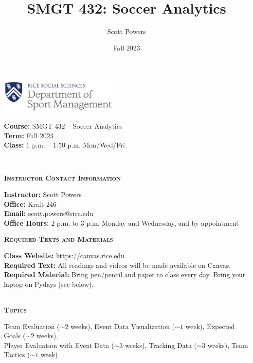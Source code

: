 \documentclass[11pt]{article}
\title{SMGT 432: Soccer Analytics}
\author{Scott Powers}
\date{Fall 2023}
\begin{document}
\begin{multicols}{2}

	\includegraphics[width = 0.45\textwidth]{../../images/rice_smgt.png}

	\columnbreak

	\raggedleft
	{\bf Course:} SMGT $432$ -- Soccer Analytics\\
	{\bf Term:} Fall $2023$\\
	{\bf Class:} $1$ p.m. -- $1$:$50$ p.m. Mon/Wed/Fri

\end{multicols}

\hrule

~\\
\textbf{\textsc{Instructor Contact Information}}
\begin{adjustwidth}{1cm}{0cm}
	{\bf Instructor:} Scott Powers\\
  {\bf Office:} Kraft $246$\\
  {\bf Email:} scott.powers@rice.edu\\
  {\bf Office Hours:} $2$ p.m. to $3$ p.m. Monday and Wednesday, and by appointment\\
\end{adjustwidth}

\textbf{\textsc{Required Texts and Materials}}
\begin{adjustwidth}{1cm}{0cm}
	{\bf Class Website:} https://canvas.rice.edu\\
	{\bf Required Text:} All readings and videos will be made available on Canvas.\\
	{\bf Required Material:} Bring pen/pencil and paper to class every day. Bring your laptop on Pydays (see below).
\end{adjustwidth}

~\\
\textbf{\textsc{Topics}}
\begin{adjustwidth}{1cm}{0cm}
	Team Evaluation ($\sim 2$ weeks), Event Data Visualization ($\sim 1$ week), Expected Goals ($\sim 2$ weeks),\\
  Player Evaluation with Event Data ($\sim 3$ weeks), Tracking Data ($\sim 3$ weeks), Team Tactics ($\sim 1$ week)
\end{adjustwidth}
\end{document}
